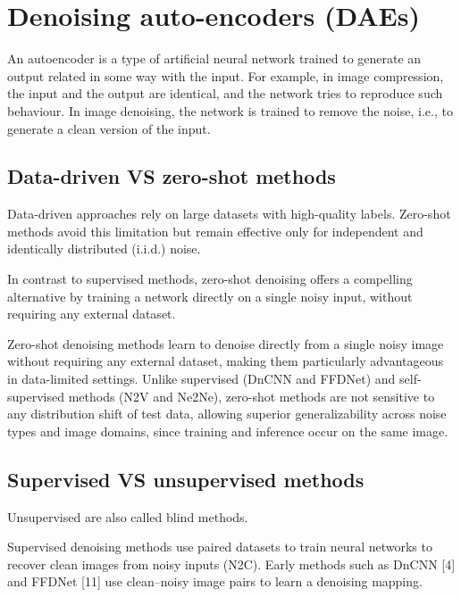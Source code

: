 \chapter{Denoising auto-encoders (DAEs)}

An autoencoder is a type of artificial neural network trained to
generate an output related in some way with the input. For example, in
image compression, the input and the output are identical, and the
network tries to reproduce such behaviour. In image denoising, the
network is trained to remove the noise, i.e., to generate a clean
version of the input.

\section{Data-driven VS zero-shot methods}
Data-driven approaches rely on large datasets with high-quality
labels. Zero-shot methods avoid this limitation but remain effective
only for independent and identically distributed (i.i.d.) noise. %

In contrast to supervised methods, zero-shot denoising offers a
compelling alternative by training a network directly on a single
noisy input, without requiring any external dataset. %

Zero-shot denoising methods learn to denoise directly from a single
noisy image without requiring any external dataset, making them
particularly advantageous in data-limited settings. Unlike supervised (DnCNN and FFDNet)
and self-supervised methods (N2V and Ne2Ne), zero-shot methods are not sensitive to
any distribution shift of test data, allowing superior
generalizability across noise types and image domains, since training
and inference occur on the same image.

\section{Supervised VS unsupervised methods}
Unsupervised are also called blind methods. %

Supervised denoising methods use paired datasets to train neural
networks to recover clean images from noisy inputs (N2C).  Early methods
such as DnCNN [4] and FFDNet [11] use clean–noisy image pairs to
learn a denoising mapping. %

